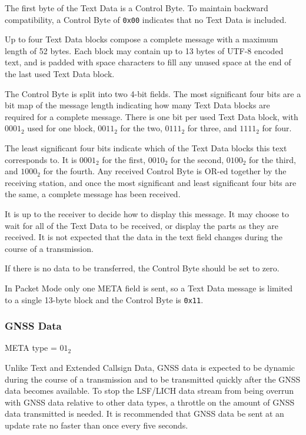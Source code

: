 \documentclass[a4paper,11pt,oneside]{book}
\begin{document}
The first byte of the Text Data is a Control Byte. To maintain backward compatibility, a Control Byte of \texttt{0x00} indicates that no Text Data is included.

Up to four Text Data blocks compose a complete message with a maximum length of 52 bytes. Each block may contain up to 13 bytes of UTF-8 encoded text, and is padded with space characters to fill any unused space at the end of the last used Text Data block.

The Control Byte is split into two 4-bit fields. The most significant four bits are a bit map of the message length indicating how many Text Data blocks are required for a complete message. There is one bit per used Text Data block, with $0001_2$ used for one block, $0011_2$ for the two, $0111_2$ for three, and $1111_2$ for four.

The least significant four bits indicate which of the Text Data blocks this text corresponds to. It is $0001_2$ for the first, $0010_2$ for the second, $0100_2$ for the third, and $1000_2$ for the fourth. Any received Control Byte is OR-ed together by the receiving station, and once the most significant and least significant four bits are the same, a complete message has been received.

It is up to the receiver to decide how to display this message. It may choose to wait for all of the Text Data to be received, or display the parts as they are received. It is not expected that the data in the text field changes during the course of a transmission.

If there is no data to be transferred, the Control Byte should be set to zero.

In Packet Mode only one META field is sent, so a Text Data message is limited to a single 13-byte block and the Control Byte is \texttt{0x11}.

\subsubsection{GNSS Data}

META type = $01_2$

Unlike Text and Extended Callsign Data, GNSS data is expected to be dynamic during the course of a transmission and to be transmitted quickly after the GNSS data becomes available. To stop the LSF/LICH data stream from being overrun with GNSS data relative to other data types, a throttle on the amount of GNSS data transmitted is needed. It is recommended that GNSS data be sent at an update rate no faster than once every five seconds.
\end{document}
